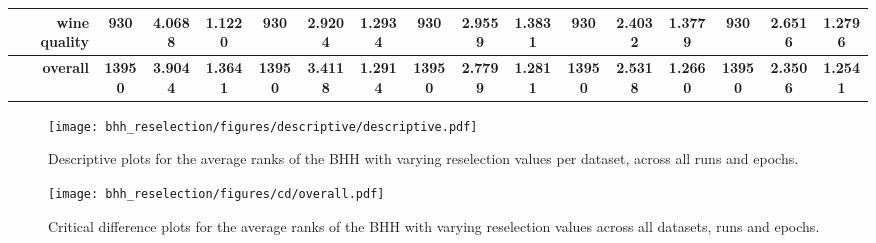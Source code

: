 \begin{table}[htbp]
{\begin{tabular}{rccccccccccccccc}
			wine quality                        & 930                                      & 4.0688                                                                    & 1.1220          & 930                            & 2.9204          & 1.2934          & 930                             & 2.9559          & 1.3831          & 930                             & \cellcolor[rgb]{ .776,  .937,  .808}\textcolor[rgb]{ 0,  .38,  0}{2.4032} & 1.3779          & 930                             & 2.6516                                                                             & 1.2796          \\
			\midrule
			\textbf{overall}                    & \textbf{13950}                           & \textbf{3.9044}                                                           & \textbf{1.3641} & \textbf{13950}                 & \textbf{3.4118} & \textbf{1.2914} & \textbf{13950}                  & \textbf{2.7799} & \textbf{1.2811} & \textbf{13950}                  & \textbf{2.5318}                                                           & \textbf{1.2660} & \textbf{13950}                  & \cellcolor[rgb]{ .776,  .937,  .808}\textcolor[rgb]{ 0,  .38,  0}{\textbf{2.3506}} & \textbf{1.2541} \\
		\end{tabular}%
	}
\end{table}%

\begin{figure}[htbp]
	\centering
	\texttt{[image: bhh\_reselection/figures/descriptive/descriptive.pdf]}
	\caption{Descriptive plots for the average ranks of the \acs{BHH} with varying reselection values per dataset, across all runs and epochs.}
	\label{fig:results:reselection:descriptive:descriptive}
\end{figure}

\begin{figure}[htbp]
	\centering
	\texttt{[image: bhh\_reselection/figures/cd/overall.pdf]}
	\caption{Critical difference plots for the average ranks of the \acs{BHH} with varying reselection values across all datasets, runs and epochs.}
	\label{fig:results:reselection:descriptive:cd}
\end{figure}

